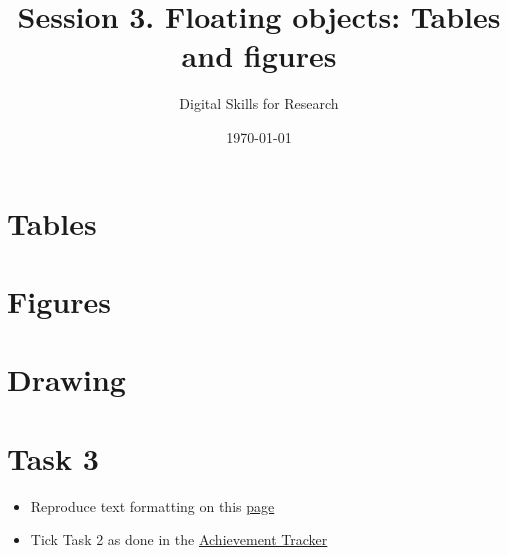 \documentclass[a4paper,11pt]{article}
\title{Session 3. Floating objects: Tables and figures}
\author{Digital Skills for Research}
\date{\today}
\begin{document}
\maketitle
\tableofcontents

\section{Tables}

\section{Figures}

\section{Drawing}

\section*{Task 3}
\label{task}

\begin{tcolorbox}[width=\textwidth, colback={yellow!40!white}, title={}, colbacktitle=yellow!60!white, coltitle=black]
	\begin{itemize}
		\item Reproduce text formatting on this \href{https://github.com/kunilovskaya/dskills_workshop/blob/main/w1_latex_basics/s2/practice2.pdf}{page}
		\item Tick Task 2 as done in the \href{https://docs.google.com/document/d/17ZBAQGBKIlO6JMwxz3LlghYq1sdsUjhHVXga46BK0kg/edit?usp=sharing}{Achievement Tracker}
	\end{itemize}
	
\end{tcolorbox}%
\end{document}

